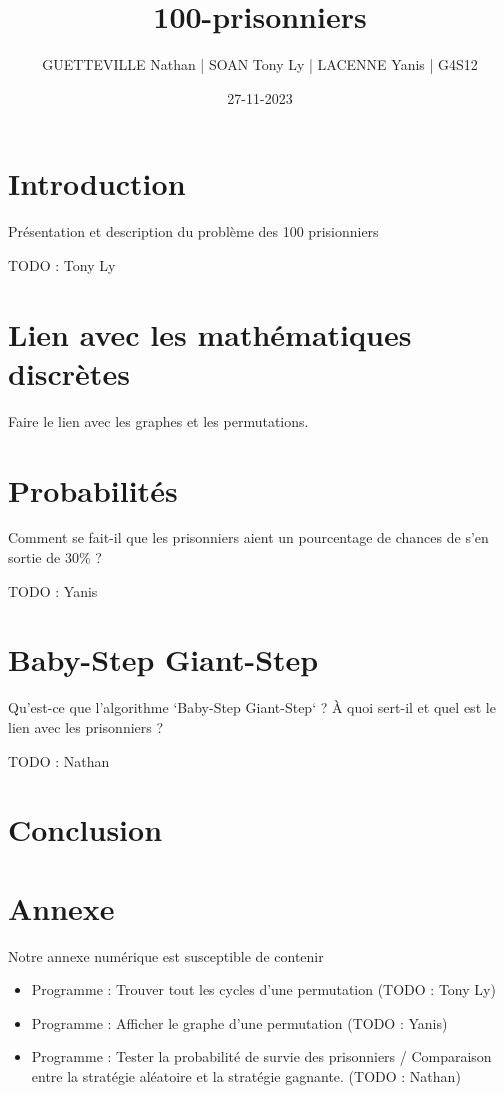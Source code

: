 \documentclass{article}
\title{100-prisonniers}
\date{27-11-2023}
\author{GUETTEVILLE Nathan | SOAN Tony Ly | LACENNE Yanis | G4S12}
\begin{document}
\maketitle
{}

\tableofcontents

\newpage
\section{Introduction}
Présentation et description du problème des 100 prisionniers

TODO : Tony Ly

\section{Lien avec les mathématiques discrètes}
Faire le lien avec les graphes et les permutations.

\section{Probabilités}
Comment se fait-il que les prisonniers aient un pourcentage de chances de s'en sortie de 30\% ?

TODO : Yanis

\section{Baby-Step Giant-Step}
Qu'est-ce que l'algorithme `Baby-Step Giant-Step` ? À quoi sert-il et quel est le lien avec les prisonniers ?

TODO : Nathan

\section{Conclusion}

\section{Annexe}
Notre annexe numérique est susceptible de contenir
\begin{itemize}
	\item Programme : Trouver tout les cycles d'une permutation
	      (TODO : Tony Ly)
	\item Programme : Afficher le graphe d'une permutation
	      (TODO : Yanis)
	\item Programme : Tester la probabilité de survie des prisonniers / Comparaison entre la stratégie aléatoire et la stratégie gagnante.
	      (TODO : Nathan)
\end{itemize}
\end{document}
